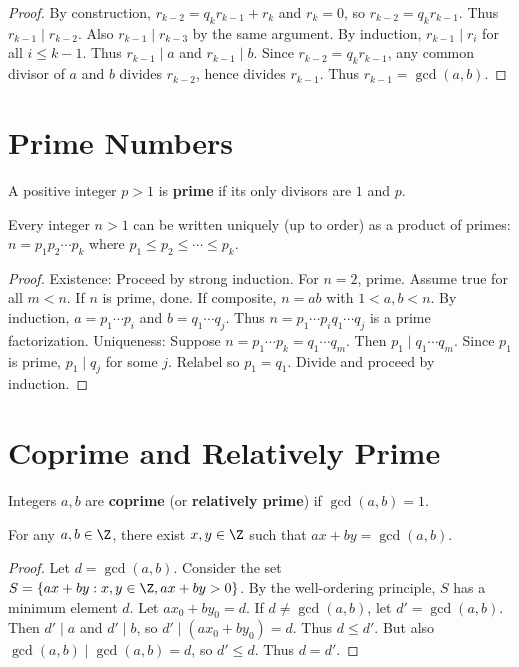 \begin{proof}
By construction, $r_{k-2} = q_k r_{k-1} + r_k$ and $r_k = 0$, so $r_{k-2} = q_k r_{k-1}$. Thus $r_{k-1} \mid r_{k-2}$. Also $r_{k-1} \mid r_{k-3}$ by the same argument. By induction, $r_{k-1} \mid r_i$ for all $i \leq k-1$. Thus $r_{k-1} \mid a$ and $r_{k-1} \mid b$. Since $r_{k-2} = q_k r_{k-1}$, any common divisor of $a$ and $b$ divides $r_{k-2}$, hence divides $r_{k-1}$. Thus $r_{k-1} = \gcd(a, b)$.
\end{proof}

\section{Prime Numbers}
\label{sec:primes}

A positive integer $p > 1$ is \textbf{prime} if its only divisors are $1$ and $p$.

\begin{theorem}
\label{thm:fta}
Every integer $n > 1$ can be written uniquely (up to order) as a product of primes: $n = p_1 p_2 \cdots p_k$ where $p_1 \leq p_2 \leq \cdots \leq p_k$.
\end{theorem}

\begin{proof}
Existence: Proceed by strong induction. For $n = 2$, prime. Assume true for all $m < n$. If $n$ is prime, done. If composite, $n = ab$ with $1 < a, b < n$. By induction, $a = p_1 \cdots p_i$ and $b = q_1 \cdots q_j$. Thus $n = p_1 \cdots p_i q_1 \cdots q_j$ is a prime factorization.
Uniqueness: Suppose $n = p_1 \cdots p_k = q_1 \cdots q_m$. Then $p_1 \mid q_1 \cdots q_m$. Since $p_1$ is prime, $p_1 \mid q_j$ for some $j$. Relabel so $p_1 = q_1$. Divide and proceed by induction.
\end{proof}

\section{Coprime and Relatively Prime}
\label{sec:coprime}

Integers $a, b$ are \textbf{coprime} (or \textbf{relatively prime}) if $\gcd(a, b) = 1$.

\begin{theorem}
\label{thm:bézout}
For any $a, b \in \Z$, there exist $x, y \in \Z$ such that $ax + by = \gcd(a, b)$.
\end{theorem}

\begin{proof}
Let $d = \gcd(a, b)$. Consider the set $S = \{ax + by : x, y \in \Z, ax + by > 0\}$. By the well-ordering principle, $S$ has a minimum element $d$. Let $ax_0 + by_0 = d$. If $d \neq \gcd(a, b)$, let $d' = \gcd(a, b)$. Then $d' \mid a$ and $d' \mid b$, so $d' \mid (ax_0 + by_0) = d$. Thus $d \leq d'$. But also $\gcd(a, b) \mid \gcd(a, b) = d$, so $d' \leq d$. Thus $d = d'$.
\end{proof}

